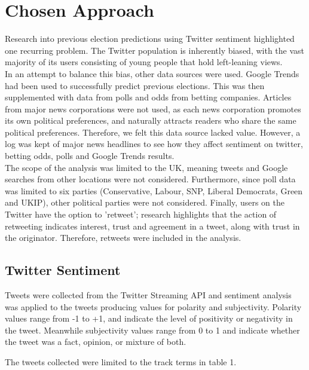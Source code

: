 \documentclass{article}
\begin{document}
\section{Chosen Approach}

Research into previous election predictions using Twitter sentiment highlighted one recurring problem. The Twitter population is inherently biased, with the vast majority of its users consisting of young people that hold left-leaning views. \\

In an attempt to balance this bias, other data sources were used. Google Trends had been used to successfully predict previous elections. This was then supplemented with data from polls and odds from betting companies. Articles from major news corporations were not used, as each news corporation promotes its own political preferences, and naturally attracts readers who share the same political preferences. Therefore, we felt this data source lacked value. However, a log was kept of major news headlines to see how they affect sentiment on twitter, betting odds, polls and Google Trends results. \\

The scope of the analysis was limited to the UK, meaning tweets and Google searches from other locations were not considered. Furthermore, since poll data was limited to six parties (Conservative, Labour, SNP, Liberal Democrats, Green and UKIP), other political parties were not considered. Finally, users on the Twitter have the option to 'retweet'; research highlights that the action of retweeting indicates interest, trust and agreement in a tweet, along with trust in the originator. Therefore, retweets were included in the analysis.

\subsection{Twitter Sentiment}

Tweets were collected from the Twitter Streaming API and sentiment analysis was applied to the tweets producing values for polarity and subjectivity. Polarity values range from -1 to +1, and indicate the level of positivity or negativity in the tweet. Meanwhile subjectivity values range from 0 to 1 and indicate whether the tweet was a fact, opinion, or mixture of both.

The tweets collected were limited to the track terms in table 1.\\
\end{document}
